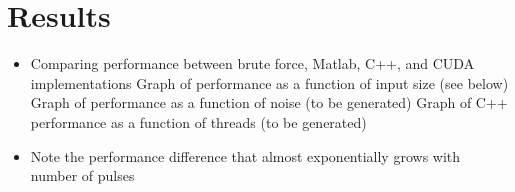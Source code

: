 \section{Results}\label{sec:Results}

\begin{itemize}
  \item Comparing performance between brute force, Matlab, C++, and CUDA implementations
    \subitem Graph of performance as a function of input size (see below)
    \subitem Graph of performance as a function of noise (to be generated)
    \subitem Graph of C++ performance as a function of threads (to be generated)
  \item Note the performance difference that almost exponentially grows with number of pulses
\end{itemize}

